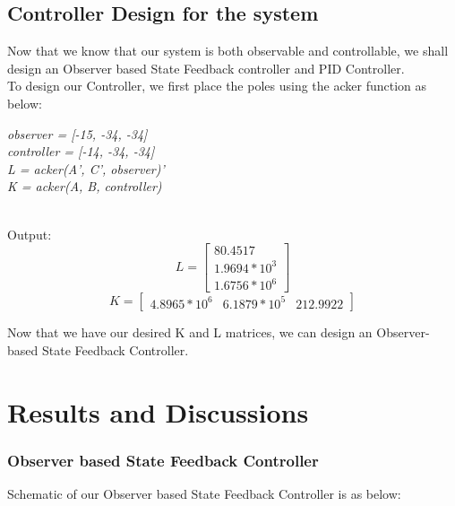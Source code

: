 \documentclass{article}
\begin{document}
\subsection{Controller Design for the system}
\noindent Now that we know that our system is both observable and controllable, we shall design an Observer based State Feedback controller and PID Controller. \\

\noindent To design our Controller, we first place the poles using the acker function as below: 
\\
\begin{center}
\textit{observer = [-15, -34, -34]\\
controller  = [-14, -34, -34]\\
L = acker(A', C',  observer)'\\
K = acker(A, B,  controller)\\}
\end{center}

\\
Output:
\begin{equation}
L = \begin{bmatrix}
80.4517 \\
1.9694 * 10^3 \\
1.6756 * 10^6 \end{bmatrix}
\end{equation}
\vskip15pt
\begin{equation}
K = 
\begin{bmatrix}
4.8965*10^6 & 6.1879*10^5 & 212.9922 
\end{bmatrix}
\end{equation}
\vskip10pt

\noindent Now that we have our desired K and L matrices, we can design an Observer-based State Feedback Controller. 

\pagebreak
\section{Results and Discussions}
\subsubsection{Observer based State Feedback Controller}

Schematic of our Observer based State Feedback Controller is as below:
\end{document}
